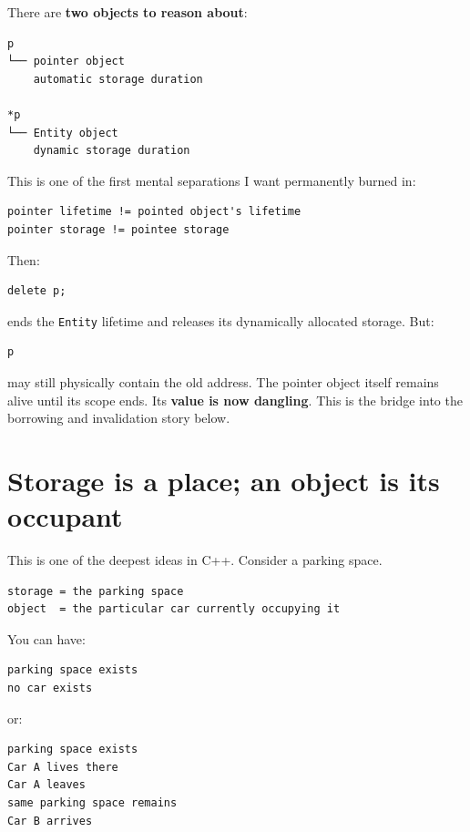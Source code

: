 There are \textbf{two objects to reason about}:

\begin{verbatim}
p
└── pointer object
    automatic storage duration

*p
└── Entity object
    dynamic storage duration
\end{verbatim}

This is one of the first mental separations I want permanently burned in:

\begin{verbatim}
pointer lifetime != pointed object's lifetime
pointer storage != pointee storage
\end{verbatim}

Then:

\begin{verbatim}
delete p;
\end{verbatim}

ends the \texttt{Entity} lifetime and releases its dynamically allocated storage. But:

\begin{verbatim}
p
\end{verbatim}

may still physically contain the old address. The pointer object itself remains alive until its scope ends. Its \textbf{value is now dangling}. This is the bridge into the borrowing and invalidation story below.

\section{Storage is a place; an object is its occupant}\label{05-engine-i-ch002-storage-is-a-place-an-object-is-its-occupant}

\hypertarget{05-engine-i-ch002-storage-is-a-place-an-object-is-its-occupant}{}

This is one of the deepest ideas in C++. Consider a parking space.

\begin{verbatim}
storage = the parking space
object  = the particular car currently occupying it
\end{verbatim}

You can have:

\begin{verbatim}
parking space exists
no car exists
\end{verbatim}

or:

\begin{verbatim}
parking space exists
Car A lives there
Car A leaves
same parking space remains
Car B arrives
\end{verbatim}

